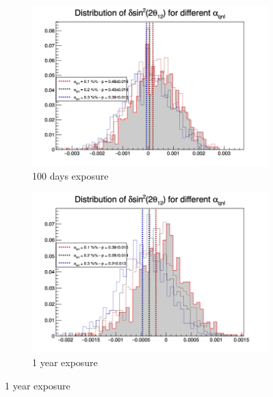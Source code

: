 \documentclass[../main.tex]{subfiles}
\begin{document}
\begin{figure}[th]
  \centering
  \begin{subfigure}[t]{0.48\linewidth}
    \includegraphics[width=\linewidth]{images/joint_fit/stat_tests/chi2_delta_100d.png}
    \caption{100 days exposure}
  \end{subfigure}
  \begin{subfigure}[t]{0.48\linewidth}
    \includegraphics[width=\linewidth]{images/joint_fit/stat_tests/chi2_delta_1y.png}
    \caption{1 year exposure}
  \end{subfigure}



\end{figure}
\end{document}
